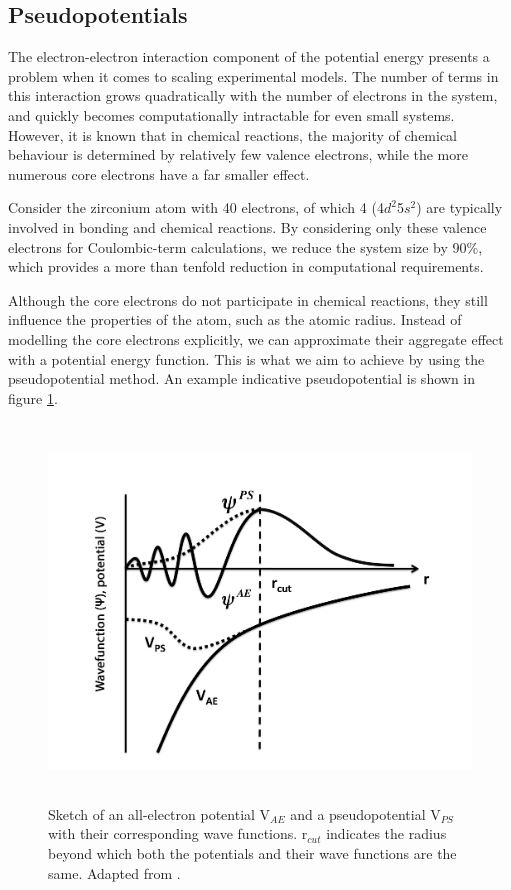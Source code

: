 \subsection{Pseudopotentials}

The electron-electron interaction component of the potential energy presents a problem when it comes to scaling experimental models. The number of terms in this interaction grows quadratically with the number of electrons in the system, and quickly becomes computationally intractable for even small systems. However, it is known that in chemical reactions, the majority of chemical behaviour is determined by relatively few valence electrons, while the more numerous core electrons have a far smaller effect. 

Consider the zirconium atom with 40 electrons, of which 4 (4$d^2$5$s^2$) are typically involved in bonding and chemical reactions. By considering only these valence electrons for Coulombic-term calculations, we reduce the system size by 90\%, which provides a more than tenfold reduction in computational requirements.

Although the core electrons do not participate in chemical reactions, they still influence the properties of the atom, such as the atomic radius. Instead of modelling the core electrons explicitly, we can approximate their aggregate effect with a potential energy function. This is what we aim to achieve by using the pseudopotential method. An example indicative pseudopotential is shown in figure \ref{figure:pseudopotential}.

\begin{figure}[ht] %
\begin{center}
\includegraphics[height=10cm]{images/pseudopotential.png}
\end{center}
\caption[Sketch of an all-electron potential V$_{AE}$ and a pseudopotential V$_{PS}$ with their corresponding wave functions. r$_{cut}$ indicates the radius beyond which both the potentials and their wave functions are the same.]{Sketch of an all-electron potential V$_{AE}$ and a pseudopotential V$_{PS}$ with their corresponding wave functions. r$_{cut}$ indicates the radius beyond which both the potentials and their wave functions are the same. Adapted from \cite{Payne1992}.}
\label{figure:pseudopotential}
\end{figure}

